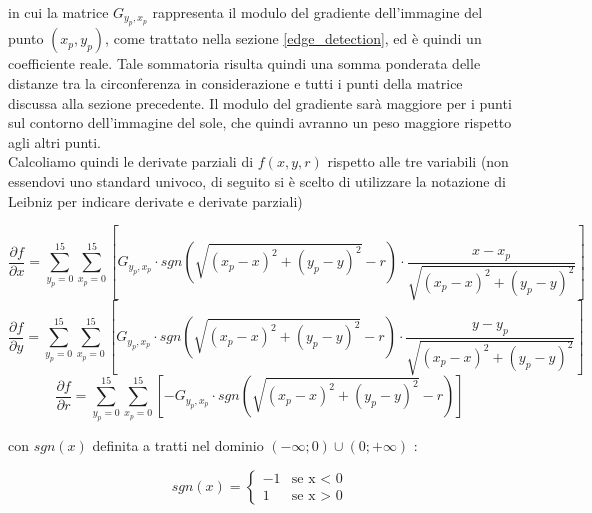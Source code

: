\documentclass[12pt]{article}
\begin{document}
        \noindent
        in cui la matrice $ G_{y_p, x_p} $ rappresenta il modulo del gradiente dell'immagine del punto $ (x_p, y_p) $, come trattato nella sezione \ref{edge_detection}, ed è quindi un coefficiente reale. Tale sommatoria risulta quindi una somma ponderata delle distanze tra la circonferenza in considerazione e tutti i punti della matrice discussa alla sezione precedente. Il modulo del gradiente sarà maggiore per i punti sul contorno dell'immagine del sole, che quindi avranno un peso maggiore rispetto agli altri punti.\\
        
        \vspace{1cm}
        Calcoliamo quindi le derivate parziali di $ f(x, y, r) $ rispetto alle tre variabili (non essendovi uno standard univoco, di seguito si è scelto di utilizzare la notazione di Leibniz per indicare derivate e derivate parziali)
        
        \begin {equation}
            \frac{\partial f}{\partial x} = \sum_{y_p = 0}^{15} \sum_{x_p = 0}^{15} \left[ G_{y_p, x_p} \cdot sgn \left( \sqrt{(x_p-x)^2 + (y_p-y)^2} - r \right) \cdot \frac{x - x_p}{\sqrt{(x_p - x)^2 + (y_p - y)^2}} \right] 
        \end {equation}
        \begin {equation}
            \frac{\partial f}{\partial y} = \sum_{y_p = 0}^{15} \sum_{x_p = 0}^{15} \left[ G_{y_p, x_p} \cdot sgn \left( \sqrt{(x_p-x)^2 + (y_p-y)^2} - r \right) \cdot \frac{y - y_p}{\sqrt{(x_p - x)^2 + (y_p - y)^2}} \right] 
        \end {equation}
        \begin {equation}
            \frac{\partial f}{\partial r} = \sum_{y_p = 0}^{15} \sum_{x_p = 0}^{15} \left[ - G_{y_p, x_p} \cdot sgn \left( \sqrt{(x_p-x)^2 + (y_p-y)^2} - r \right) \right] 
        \end {equation}
        
        \noindent
        con $ sgn(x)$ definita a tratti nel dominio $(- \infty ; 0) \cup (0; +\infty) $ :
        
        \begin {equation}
            sgn(x) = 
                \begin{cases}
                  -1 & \text{se x < 0} \\
                  1 & \text{se x > 0}
                \end{cases}
        \end {equation}
        
\end{document}

